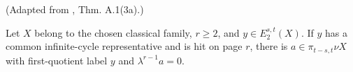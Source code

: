 \begin{theorem}
\label{frontier:Literature:90a18b9fe1e0}
(Adapted from \cite{BHS}, Thm. A.1(3a).)\par{}

Let $X$ belong to the chosen classical family, $r\ge2$, and $y\in E_2^{s,t}(X)$. If $y$ has a common infinite-cycle representative and is hit on page $r$, there is $a\in\pi_{t-s,t}\nu X$ with first-quotient label $y$ and $\lambda^{r-1}a=0$.
\end{theorem}

